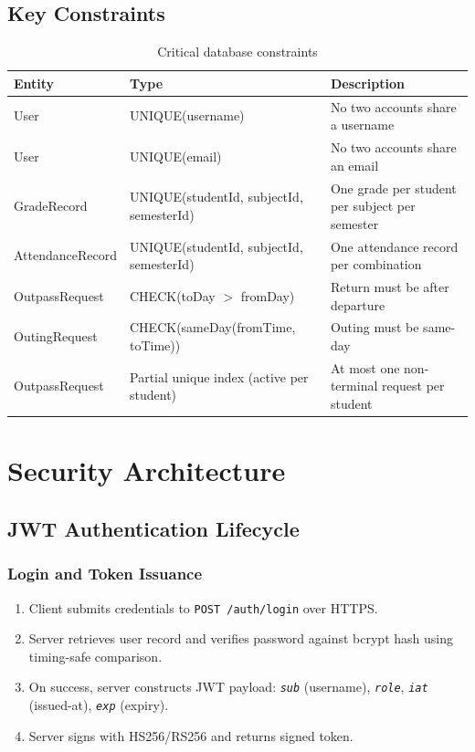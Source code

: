 \documentclass[12pt,a4paper]{report}
\newcommand{\api}[1]{\texttt{\small #1}}
\newcommand{\field}[1]{\texttt{\textit{#1}}}
\begin{document}
\section{Key Constraints}

\begin{table}[H]
\centering
\caption{Critical database constraints}
\label{tab:constraints}
\renewcommand{\arraystretch}{1.2}
\begin{tabularx}{\textwidth}{llX}
\toprule
\textbf{Entity} & \textbf{Type} & \textbf{Description} \\
\midrule
User & UNIQUE(username) & No two accounts share a username \\
User & UNIQUE(email) & No two accounts share an email \\
GradeRecord & UNIQUE(studentId, subjectId, semesterId) & One grade per student per subject per semester \\
AttendanceRecord & UNIQUE(studentId, subjectId, semesterId) & One attendance record per combination \\
OutpassRequest & CHECK(toDay $>$ fromDay) & Return must be after departure \\
OutingRequest & CHECK(sameDay(fromTime, toTime)) & Outing must be same-day \\
OutpassRequest & Partial unique index (active per student) & At most one non-terminal request per student \\
\bottomrule
\end{tabularx}
\end{table}

\chapter{Security Architecture}

\section{JWT Authentication Lifecycle}

\subsection{Login and Token Issuance}
\begin{enumerate}[label=(\arabic*)]
  \item Client submits credentials to \api{POST /auth/login} over HTTPS.
  \item Server retrieves user record and verifies password against bcrypt hash using timing-safe comparison.
  \item On success, server constructs JWT payload: \field{sub} (username), \field{role}, \field{iat} (issued-at), \field{exp} (expiry).
  \item Server signs with HS256/RS256 and returns signed token.
\end{enumerate}
\end{document}
